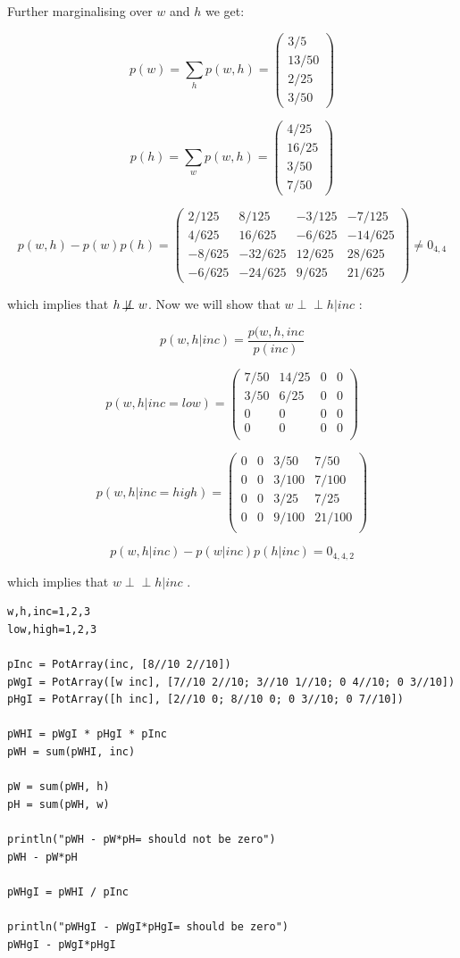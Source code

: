\documentclass[11pt,a4paper,oneside]{report}
\newcommand\ci{\perp\!\!\!\perp} %
\begin{document}
Further marginalising over $w$ and $h$ we get:

$$p(w) = \sum_{h}p(w,h) = 
\begin{pmatrix}
  3/5\\
  13/50\\
  2/25\\
  3/50
\end{pmatrix}
$$

$$p(h) = \sum_{w}p(w,h) = 
\begin{pmatrix}
4/25\\
16/25\\
3/50\\
7/50
\end{pmatrix}
$$

$$p(w,h) - p(w)p(h) = 
\begin{pmatrix}
  2/125 &   8/125 & -3/125 &  -7/125\\
  4/625 &  16/625 & -6/625 & -14/625\\
 -8/625 & -32/625 & 12/625 &  28/625\\
 -6/625 & -24/625 &  9/625 &  21/625
\end{pmatrix} \neq 0_{4,4}
$$

which implies that  $h \not\!\perp\!\!\!\perp w$. Now we will show that $ w 
\ci h | inc$ :

$$ p(w,h| inc) = \frac{p(w,h,inc}{p(inc)} $$

$$ p(w,h | inc = low) = 
\begin{pmatrix}
 7/50 & 14/25 & 0 & 0\\
 3/50 &  6/25 & 0 & 0\\
 0   & 0  & 0 & 0\\
 0   & 0  & 0 & 0\\
\end{pmatrix}
$$

$$ p(w,h | inc = high) = 
\begin{pmatrix}
 0 & 0 & 3/50  &  7/50\\ 
 0 & 0 & 3/100 &  7/100\\
 0 & 0 & 3/25  &  7/25 \\
 0 & 0 & 9/100 & 21/100\\
\end{pmatrix}
$$

$$p(w,h|inc) - p(w|inc)p(h|inc) = 0_{4,4,2}
$$

which implies that $ w \ci h | inc$ . 
\begin{lstlisting}
w,h,inc=1,2,3
low,high=1,2,3

pInc = PotArray(inc, [8//10 2//10])
pWgI = PotArray([w inc], [7//10 2//10; 3//10 1//10; 0 4//10; 0 3//10])
pHgI = PotArray([h inc], [2//10 0; 8//10 0; 0 3//10; 0 7//10])

pWHI = pWgI * pHgI * pInc
pWH = sum(pWHI, inc)

pW = sum(pWH, h)
pH = sum(pWH, w)

println("pWH - pW*pH= should not be zero")
pWH - pW*pH

pWHgI = pWHI / pInc

println("pWHgI - pWgI*pHgI= should be zero")
pWHgI - pWgI*pHgI


\end{lstlisting}
\end{document}
